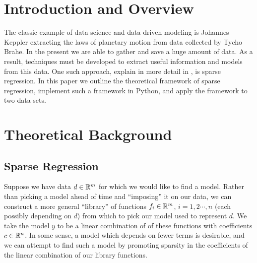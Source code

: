 \documentclass[10pt]{article}
\begin{document}

\section{Introduction and Overview}
The classic example of data science and data driven modeling is Johannes Keppler extracting the laws of planetary motion from data collected by Tycho Brahe. In the present we are able to gather and save a huge amount of data. As a result, techniques must be developed to extract useful information and models from this data. One such approach, explain in more detail in \cite{Brunton3932,lecture_notes}, is sparse regression. In this paper we outline the theoretical framework of sparse regression, implement such a framework in Python, and apply the framework to two data sets.

\section{Theoretical Background}

\subsection{Sparse Regression}
Suppose we have data \( d\in\mathbb{R}^m \) for which we would like to find a model. Rather than picking a model ahead of time and ``imposing'' it on our data, we can construct a more general ``library'' of functions \( f_i \in \mathbb{R}^{m} \), \( i=1,2 \cdots, n \) (each possibly depending on \( d \)) from which to pick our model used to represent \( d \). We take the model \( y \) to be a linear combination of of these functions with coefficients \( c\in\mathbb{R}^{n} \).
In some sense, a model which depends on fewer terms is desirable, and we can attempt to find such a model by promoting sparsity in the coefficients of the linear combination of our library functions.
\end{document}
